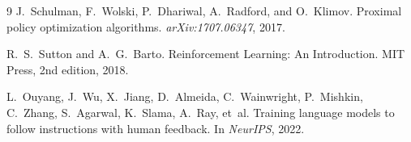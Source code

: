 \documentclass{article}
\begin{document}
\begin{thebibliography}{9}
J.~Schulman, F.~Wolski, P.~Dhariwal, A.~Radford, and O.~Klimov.
\newblock Proximal policy optimization algorithms.
\newblock \emph{arXiv:1707.06347}, 2017.

R.~S.~Sutton and A.~G.~Barto.
\newblock Reinforcement Learning: An Introduction.
\newblock MIT Press, 2nd edition, 2018.

L.~Ouyang, J.~Wu, X.~Jiang, D.~Almeida, C.~Wainwright, P.~Mishkin, C.~Zhang, S.~Agarwal, K.~Slama, A.~Ray, et~al.
\newblock Training language models to follow instructions with human feedback.
\newblock In \emph{NeurIPS}, 2022.

\end{thebibliography}
\end{document}
